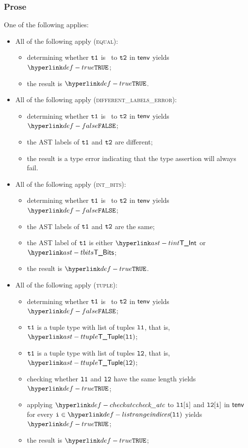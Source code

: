 \subsubsection{Prose}
One of the following applies:
\begin{itemize}
  \item All of the following apply (\textsc{equal}):
  \begin{itemize}
    \item determining whether $\texttt{t1}$ is \typeequivalent\ to $\texttt{t2}$ in $\textsf{tenv}$ yields $\True$\ProseOrTypeError;
    \item the result is $\True$.
  \end{itemize}

  \item All of the following apply (\textsc{different\_labels\_error}):
  \begin{itemize}
    \item determining whether $\texttt{t1}$ is \typeequivalent\ to $\texttt{t2}$ in $\textsf{tenv}$ yields $\False$;
    \item the AST labels of $\texttt{t1}$ and $\texttt{t2}$ are different;
    \item the result is a type error indicating that the type assertion will always fail.
  \end{itemize}

  \item All of the following apply (\textsc{int\_bits}):
  \begin{itemize}
    \item determining whether $\texttt{t1}$ is \typeequivalent\ to $\texttt{t2}$ in $\textsf{tenv}$ yields $\False$;
    \item the AST labels of $\texttt{t1}$ and $\texttt{t2}$ are the same;
    \item the AST label of $\texttt{t1}$ is either $\TInt$ or $\TBits$;
    \item the result is $\True$.
  \end{itemize}

  \item All of the following apply (\textsc{tuple}):
  \begin{itemize}
    \item determining whether $\texttt{t1}$ is \typeequivalent\ to $\texttt{t2}$ in $\textsf{tenv}$ yields $\False$;
    \item $\texttt{t1}$ is a tuple type with list of tuples $\texttt{l1}$, that is, $\TTuple(\vlone)$;
    \item $\texttt{t1}$ is a tuple type with list of tuples $\texttt{l2}$, that is, $\TTuple(\vltwo)$;
    \item checking whether $\texttt{l1}$ and $\texttt{l2}$ have the same length yields $\True$\ProseTerminateAs{\TypeErrorVal{\TypeAsssertionFails}};
    \item applying $\checkatc$ to $\texttt{l1}[\texttt{i}]$ and $\texttt{l2}[\texttt{i}]$ in $\textsf{tenv}$ for every $\vi\in\listrange(\vlone)$ yields $\True$\ProseOrTypeError;
    \item the result is $\True$;
  \end{itemize}


\end{itemize}
